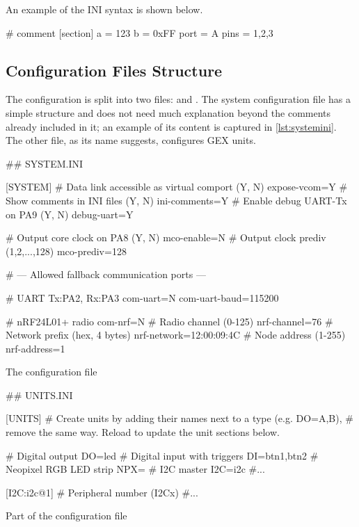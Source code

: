 \noindent
An example of the INI syntax is shown below.

\begin{inicode}
# comment
[section]
a = 123
b = 0xFF
port = A
pins = 1,2,3
\end{inicode}
	
\subsection{Configuration Files Structure}

The configuration is split into two files:  and . The system configuration file has a simple structure and does not need much explanation beyond the comments already included in it; an example of its content is captured in \cref{lst:systemini}. The other file, as its name suggests, configures GEX units.

\begin{listing}
	\begin{inicode}
		## SYSTEM.INI
		
		[SYSTEM]
		# Data link accessible as virtual comport (Y, N)
		expose-vcom=Y
		# Show comments in INI files (Y, N)
		ini-comments=Y
		# Enable debug UART-Tx on PA9 (Y, N)
		debug-uart=Y
		
		# Output core clock on PA8 (Y, N)
		mco-enable=N
		# Output clock prediv (1,2,...,128)
		mco-prediv=128
		
		# --- Allowed fallback communication ports ---
		
		# UART Tx:PA2, Rx:PA3
		com-uart=N
		com-uart-baud=115200
		
		# nRF24L01+ radio
		com-nrf=N
		# Radio channel (0-125)
		nrf-channel=76
		# Network prefix (hex, 4 bytes)
		nrf-network=12:00:09:4C
		# Node address (1-255)
		nrf-address=1
	\end{inicode}
	\caption{\label{lst:systemini}The  configuration file}
\end{listing}

\begin{listing}
	\begin{inicode}
		## UNITS.INI
		
		[UNITS]
		# Create units by adding their names next to a type (e.g. DO=A,B),
		# remove the same way. Reload to update the unit sections below.
		
		# Digital output
		DO=led
		# Digital input with triggers
		DI=btn1,btn2
		# Neopixel RGB LED strip
		NPX=
		# I2C master
		I2C=i2c
		#...
		
		[I2C:i2c@1]
		# Peripheral number (I2Cx)
		#...
	\end{inicode}
	\caption{\label{lst:unitsini}Part of the  configuration file}
\end{listing}

